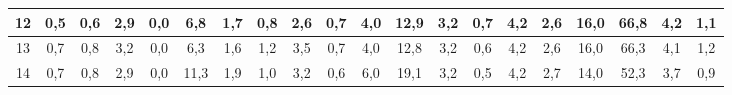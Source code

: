 \begin{sidewaystable}[]
\begin{tabular}{|c|c|c|c|c|c|c|c|c|c|c|c|c|c|c|c|c|c|c|c|}
    12 & 0,5                                             & 0,6                                             & 2,9                                             & 0,0                                             & 6,8                                              & 1,7                                              & 0,8                                              & 2,6                                              & 0,7                                              & 4,0                                              & 12,9                                             & 3,2                                              & 0,7                                              & 4,2                                              & 2,6                                              & 16,0                                             & 66,8                                             & 4,2                                              & 1,1                                              \\ \hline
    13 & 0,7                                             & 0,8                                             & 3,2                                             & 0,0                                             & 6,3                                              & 1,6                                              & 1,2                                              & 3,5                                              & 0,7                                              & 4,0                                              & 12,8                                             & 3,2                                              & 0,6                                              & 4,2                                              & 2,6                                              & 16,0                                             & 66,3                                             & 4,1                                              & 1,2                                              \\ \hline
    14 & 0,7                                             & 0,8                                             & 2,9                                             & 0,0                                             & 11,3                                             & 1,9                                              & 1,0                                              & 3,2                                              & 0,6                                              & 6,0                                              & 19,1                                             & 3,2                                              & 0,5                                              & 4,2                                              & 2,7                                              & 14,0                                             & 52,3                                             & 3,7                                              & 0,9                                              \\ \hline

\end{tabular}
\end{sidewaystable}
